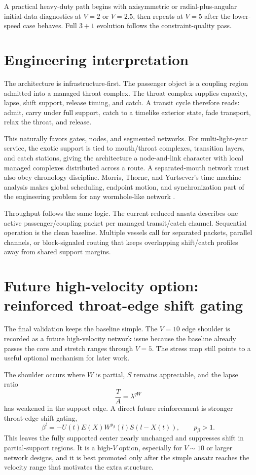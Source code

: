 \documentclass[11pt]{article}
\begin{document}
A practical heavy-duty path begins with axisymmetric or radial-plus-angular initial-data diagnostics at $V=2$ or $V=2.5$, then repeats at $V=5$ after the lower-speed case behaves.  Full $3+1$ evolution follows the constraint-quality pass.

\section{Engineering interpretation}
The architecture is infrastructure-first.  The passenger object is a coupling region admitted into a managed throat complex.  The throat complex supplies capacity, lapse, shift support, release timing, and catch.  A transit cycle therefore reads: admit, carry under full support, catch to a timelike exterior state, fade transport, relax the throat, and release.

This naturally favors gates, nodes, and segmented networks.  For multi-light-year service, the exotic support is tied to mouth/throat complexes, transition layers, and catch stations, giving the architecture a node-and-link character with local managed complexes distributed across a route.  A separated-mouth network must also obey chronology discipline.  Morris, Thorne, and Yurtsever's time-machine analysis makes global scheduling, endpoint motion, and synchronization part of the engineering problem for any wormhole-like network \citep{morris_thorne_yurtsever_1988}.

Throughput follows the same logic.  The current reduced ansatz describes one active passenger/coupling packet per managed transit/catch channel.  Sequential operation is the clean baseline.  Multiple vessels call for separated packets, parallel channels, or block-signaled routing that keeps overlapping shift/catch profiles away from shared support margins.

\section{Future high-velocity option: reinforced throat-edge shift gating}
The final validation keeps the baseline simple.  The $V=10$ edge shoulder is recorded as a future high-velocity network issue because the baseline already passes the core and stretch ranges through $V=5$.  The stress map still points to a useful optional mechanism for later work.

The shoulder occurs where $W$ is partial, $S$ remains appreciable, and the lapse ratio
\begin{equation}
 \frac{T}{A}=\lambda^{qW}
\end{equation}
has weakened in the support edge.  A direct future reinforcement is stronger throat-edge shift gating,
\begin{equation}
 \beta^l=-U(t)E(X)W^{p_\beta}(l)S(l-X(t)),
 \qquad p_\beta>1.
 \label{eq:future_W_power}
\end{equation}
This leaves the fully supported center nearly unchanged and suppresses shift in partial-support regions.  It is a high-$V$ option, especially for $V\sim10$ or larger network designs, and it is best promoted only after the simple ansatz reaches the velocity range that motivates the extra structure.
\end{document}
